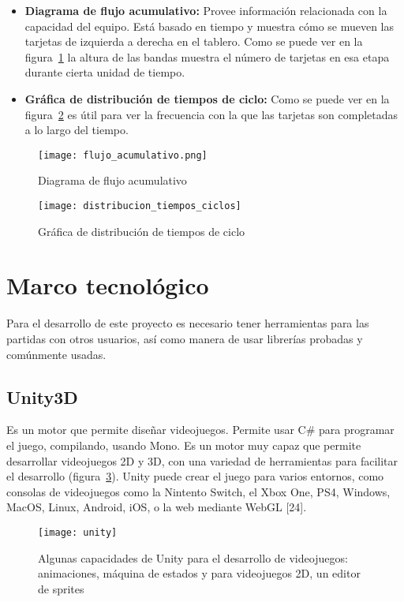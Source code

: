 \begin{itemize}
    \item \textbf{Diagrama de flujo acumulativo:} Provee información relacionada con la capacidad del equipo. Está basado en tiempo y muestra cómo se mueven las tarjetas de izquierda a derecha en el tablero. Como se puede ver en la figura~\ref{fig:flujo_acumulativo} la altura de las bandas muestra el número de tarjetas en esa etapa durante cierta unidad de tiempo.
    \item \textbf{Gráfica de distribución de tiempos de ciclo:} Como se puede ver en la figura~\ref{fig:distribucion_tiempos_ciclos} es útil para ver la frecuencia con la que las tarjetas son completadas a lo largo del tiempo.
\end{itemize}

\begin{figure}[h!]
    \centering
    \texttt{[image: flujo\_acumulativo.png]}
        \caption{Diagrama de flujo acumulativo}
    \label{fig:flujo_acumulativo}
\end{figure}

\begin{figure}[h!]
    \centering
    \texttt{[image: distribucion\_tiempos\_ciclos]}
    \caption{Gráfica de distribución de tiempos de ciclo}
    \label{fig:distribucion_tiempos_ciclos}
\end{figure}

\section{Marco tecnológico}
Para el desarrollo de este proyecto es necesario tener herramientas para las partidas con otros usuarios, así como manera de usar librerías probadas y comúnmente usadas.

\subsection{Unity3D}
Es un motor que permite diseñar videojuegos. Permite usar C\# para programar el juego, compilando, usando Mono\cite{unity2019}. Es un motor muy capaz que permite desarrollar videojuegos 2D y 3D, con una variedad de herramientas para facilitar el desarrollo (figura~\ref{fig:unity_screenshot}).
Unity puede crear el juego para varios entornos, como consolas de videojuegos como la Nintento Switch, el Xbox One, PS4, Windows, MacOS, Linux, Android, iOS, o la web mediante WebGL [24].
\begin{figure}[h]
    \centering
    \texttt{[image: unity]}
        \caption{Algunas capacidades de Unity para el desarrollo de videojuegos: animaciones, máquina de estados y para videojuegos 2D, un editor de sprites}
        \label{fig:unity_screenshot}
\end{figure}

